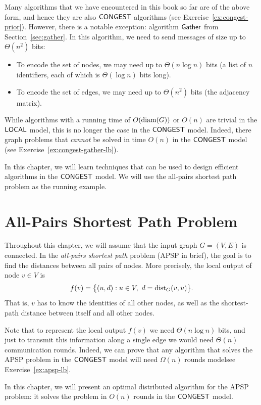 Many algorithms that we have encountered in this book so far are of the above form, and hence they are also $\textup{\sffamily CONGEST}$ algorithms (see Exercise~\ref{ex:congest-prior}). However, there is a notable exception: algorithm $\textup{\sffamily Gather}$ from Section~\ref{sec:gather}. In this algorithm, we need to send messages of size up to $\Theta(n^2)$ bits:
\begin{itemize}
    \item To encode the set of nodes, we may need up to $\Theta(n \log n)$ bits (a list of $n$ identifiers, each of which is $\Theta(\log n)$ bits long).
    \item To encode the set of edges, we may need up to $\Theta(n^2)$ bits (the adjacency matrix).
\end{itemize}

While algorithms with a running time of $O(\operatorname{diam}(G))$ or $O(n)$ are trivial in the $\textup{\sffamily LOCAL}$ model, this is no longer the case in the $\textup{\sffamily CONGEST}$ model. Indeed, there graph problems that \emph{cannot} be solved in time $O(n)$ in the $\textup{\sffamily CONGEST}$ model (see Exercise~\ref{ex:congest-gather-lb}).

In this chapter, we will learn techniques that can be used to design efficient algorithms in the $\textup{\sffamily CONGEST}$ model. We will use the all-pairs shortest path problem as the running example.


\section{All-Pairs Shortest Path Problem}

Throughout this chapter, we will assume that the input graph $G = (V,E)$ is connected. In the \emph{all-pairs shortest path} problem (APSP in brief), the goal is to find the distances between all pairs of nodes. More precisely, the local output of node $v \in V$ is
\[
    f(v) = \bigl\{ (u, d) : u \in V,\ d = \operatorname{dist}_G(v, u) \bigr\}.
\]
That is, $v$ has to know the identities of all other nodes, as well as the shortest-path distance between itself and all other nodes.

Note that to represent the local output $f(v)$ we need $\Theta(n \log n)$ bits, and just to transmit this information along a single edge we would need $\Theta(n)$ communication rounds. Indeed, we can prove that any algorithm that solves the APSP problem in the $\textup{\sffamily CONGEST}$ model will need $\Omega(n)$ rounds model\mydash see Exercise~\ref{ex:apsp-lb}.

In this chapter, we will present an optimal distributed algorithm for the APSP problem: it solves the problem in $O(n)$ rounds in the $\textup{\sffamily CONGEST}$ model.

